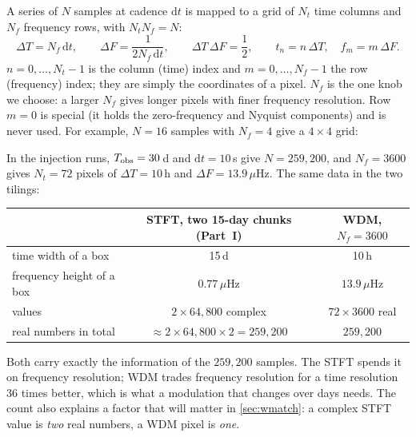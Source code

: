 \documentclass[11pt,a4paper]{article}
\newcommand{\dd}{\mathrm{d}}
\begin{document}
A series of $N$ samples at cadence $\dd t$ is mapped to a grid of $N_t$ time columns
and $N_f$ frequency rows, with $N_tN_f = N$:
\begin{equation}
  \Delta T = N_f\,\dd t,\qquad
  \Delta F = \frac{1}{2N_f\,\dd t},\qquad
  \Delta T\,\Delta F = \frac12,\qquad
  t_n = n\,\Delta T,\quad f_m = m\,\Delta F .
\end{equation}
$n=0,\dots,N_t-1$ is the column (time) index and $m=0,\dots,N_f-1$ the row
(frequency) index; they are simply the coordinates of a pixel. $N_f$ is the one knob
we choose: a larger $N_f$ gives longer pixels with finer frequency resolution. Row
$m=0$ is special (it holds the zero-frequency and Nyquist components) and is never
used. For example, $N=16$ samples with $N_f=4$ give a $4\times4$ grid:
\begin{center}
\end{center}
In the injection runs, $T_{\rm obs}=30$\,d and $\dd t=10$\,s give $N=259{,}200$, and
$N_f=3600$ gives $N_t=72$ pixels of $\Delta T=10$\,h and $\Delta F=13.9\,\mu$Hz. The
same data in the two tilings:
\begin{center}
\begin{tabular}{@{}lcc@{}}
\toprule
 & STFT, two 15-day chunks (Part~I) & WDM, $N_f=3600$ \\
\midrule
time width of a box      & 15\,d & 10\,h \\
frequency height of a box & $0.77\,\mu$Hz & $13.9\,\mu$Hz \\
values                   & $2\times64{,}800$ complex & $72\times3600$ real \\
real numbers in total    & $\approx 2\times64{,}800\times2 = 259{,}200$ & $259{,}200$ \\
\bottomrule
\end{tabular}
\end{center}
Both carry exactly the information of the $259{,}200$ samples. The STFT spends it on
frequency resolution; WDM trades frequency resolution for a time resolution 36 times
better, which is what a modulation that changes over days needs. The count also
explains a factor that will matter in \cref{sec:wmatch}: a complex STFT value is
\emph{two} real numbers, a WDM pixel is \emph{one}.
\end{document}
